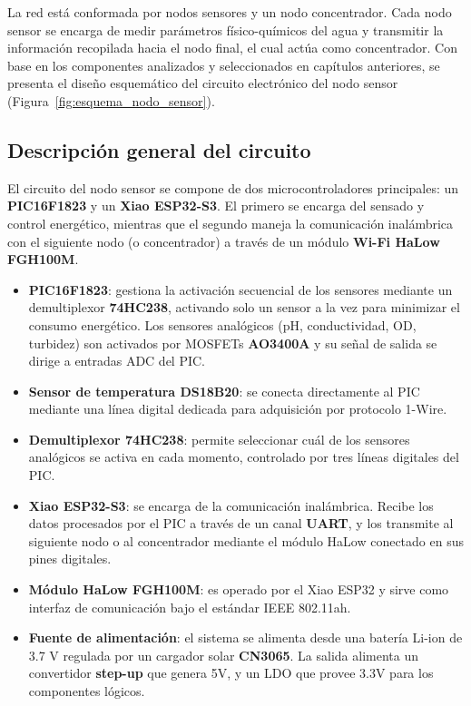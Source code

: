 La red está conformada por nodos sensores y un nodo concentrador. Cada nodo sensor se encarga de medir parámetros físico-químicos del agua y transmitir la información recopilada hacia el nodo final, el cual actúa como concentrador. Con base en los componentes analizados y seleccionados en capítulos anteriores, se presenta el diseño esquemático del circuito electrónico del nodo sensor (Figura~\ref{fig:esquema_nodo_sensor}).

\subsection*{Descripción general del circuito}

El circuito del nodo sensor se compone de dos microcontroladores principales: un \textbf{PIC16F1823} y un \textbf{Xiao ESP32-S3}. El primero se encarga del sensado y control energético, mientras que el segundo maneja la comunicación inalámbrica con el siguiente nodo (o concentrador) a través de un módulo \textbf{Wi-Fi HaLow FGH100M}.

\begin{itemize}
    \item \textbf{PIC16F1823}: gestiona la activación secuencial de los sensores mediante un demultiplexor \textbf{74HC238}, activando solo un sensor a la vez para minimizar el consumo energético. Los sensores analógicos (pH, conductividad, OD, turbidez) son activados por MOSFETs \textbf{AO3400A} y su señal de salida se dirige a entradas ADC del PIC.
    
    \item \textbf{Sensor de temperatura DS18B20}: se conecta directamente al PIC mediante una línea digital dedicada para adquisición por protocolo 1-Wire.

    \item \textbf{Demultiplexor 74HC238}: permite seleccionar cuál de los sensores analógicos se activa en cada momento, controlado por tres líneas digitales del PIC.

    \item \textbf{Xiao ESP32-S3}: se encarga de la comunicación inalámbrica. Recibe los datos procesados por el PIC a través de un canal \textbf{UART}, y los transmite al siguiente nodo o al concentrador mediante el módulo HaLow conectado en sus pines digitales.

    \item \textbf{Módulo HaLow FGH100M}: es operado por el Xiao ESP32 y sirve como interfaz de comunicación bajo el estándar IEEE 802.11ah.

    \item \textbf{Fuente de alimentación}: el sistema se alimenta desde una batería Li-ion de 3.7 V regulada por un cargador solar \textbf{CN3065}. La salida alimenta un convertidor \textbf{step-up} que genera 5V, y un LDO que provee 3.3V para los componentes lógicos.
\end{itemize}

